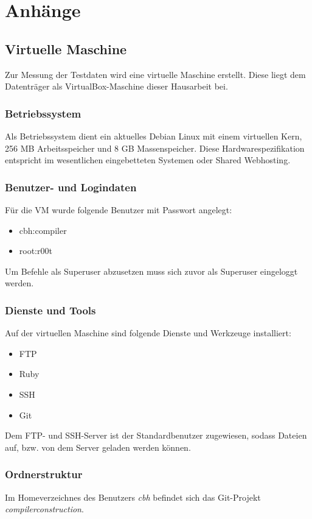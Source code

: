 \section{Anhänge}

\subsection{Virtuelle Maschine}
Zur Messung der Testdaten wird eine virtuelle Maschine erstellt. Diese liegt dem Datenträger als VirtualBox-Maschine dieser Hausarbeit bei. 

\subsubsection{Betriebssystem}
Als Betriebssystem dient ein aktuelles Debian Linux mit einem virtuellen Kern, 256 MB Arbeitsspeicher und 8 GB Massenspeicher. Diese Hardwarespezifikation entspricht im wesentlichen eingebetteten Systemen oder Shared Webhosting. 

\subsubsection{Benutzer- und Logindaten}

Für die VM wurde folgende Benutzer mit Passwort angelegt:
\begin{itemize}
    \item{cbh:compiler}
    \item{root:r00t}
\end{itemize}

Um Befehle als Superuser abzusetzen muss sich zuvor als Superuser eingeloggt werden.

\subsubsection{Dienste und Tools}

Auf der virtuellen Maschine sind folgende Dienste und Werkzeuge installiert: 

\begin{itemize}
    \item{FTP}
    \item{Ruby}
    \item{SSH}
    \item{Git}
\end{itemize}

Dem FTP- und SSH-Server ist der Standardbenutzer zugewiesen, sodass Dateien auf, bzw. von dem Server geladen werden können.

\subsubsection{Ordnerstruktur}
Im Homeverzeichnes des Benutzers \textit{cbh} befindet sich das Git-Projekt \textit{compilerconstruction}.
